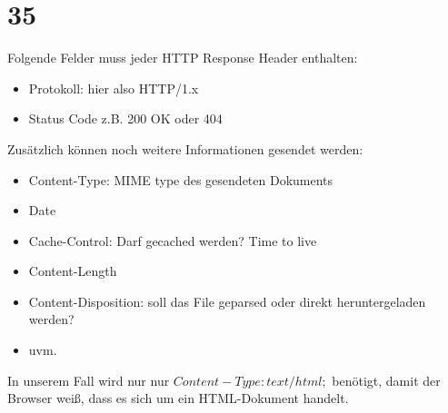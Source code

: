 \documentclass[12pt, a4paper]{article}
\begin{document}
\section*{35}
	Folgende Felder muss jeder HTTP Response Header enthalten:
	\begin{itemize}
		\item Protokoll: hier also HTTP/1.x
		\item Status Code z.B. 200 OK oder 404
	\end{itemize}
	Zusätzlich können noch weitere Informationen gesendet werden:
	\begin{itemize}
		\item Content-Type: MIME type des gesendeten Dokuments
		\item Date
		\item Cache-Control: Darf gecached werden? Time to live
		\item Content-Length
		\item Content-Disposition: soll das File geparsed oder direkt heruntergeladen werden?
		\item uvm.
	\end{itemize}
	In unserem Fall wird nur nur $Content-Type: text/html;$ benötigt, damit der Browser weiß, dass es sich um ein HTML-Dokument handelt.
	
\end{document}
